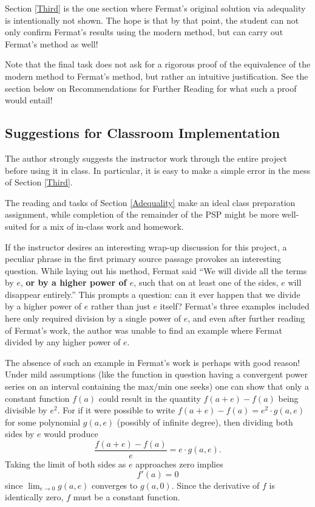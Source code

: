 Section \ref{Third} is the one section where Fermat's original
solution via adequality is intentionally not shown.  The hope is that
by that point, the student can not only confirm Fermat's results using
the modern method, but can carry out Fermat's method as well!

Note that the final task does not ask for a rigorous proof of the
equivalence of the modern method to Fermat's method, but rather an
intuitive justification.  See the section below on Recommendations for
Further Reading for what such a proof would entail!

\subsection*{Suggestions for Classroom Implementation}

The author strongly suggests the instructor work through the entire
project before using it in class. In particular, it is easy to make a
simple error in the mess of Section \ref{Third}.


The reading and tasks of Section \ref{Adequality} make an ideal class
preparation assignment, while completion of the remainder of the PSP
might be more well-suited for a mix of in-class work and homework.


If the instructor desires an interesting wrap-up discussion for this
project, a peculiar phrase in the first primary source passage
provokes an interesting question.  While laying out his method, Fermat
said ``{\sf We will divide all the terms by $e$, {\bf or by a higher
    power of $e$}, such that on at least one of the sides, $e$ will
  disappear entirely.}''  This prompts a question: can it ever happen
that we divide by a higher power of $e$ rather than just $e$ itself?
Fermat's three examples included here only required division by a
single power of $e$, and even after further reading of Fermat's work,
the author was unable to find an example where Fermat divided by any
higher power of $e$.

The absence of such an example in Fermat's work is perhaps with good
reason!  Under mild assumptions (like the function in question having
a convergent power series on an interval containing the max/min one
seeks) one can show that only a constant function $f(a)$ could result
in the quantity $f(a+e)-f(a)$ being divisible by $e^2$.  For if it
were possible to write $f(a+e)-f(a)= e^2\cdot g(a,e)$ for some
polynomial $g(a,e)$ (possibly of infinite degree), then dividing both
sides by $e$ would produce $$\frac{f(a+e)-f(a)}{e}=e\cdot g(a,e).$$
Taking the limit of both sides as $e$ approaches zero
implies $$f'(a)=0$$ since $\lim_{e\to 0}g(a,e)$ converges to $g(a,0)$.
Since the derivative of $f$ is identically zero, $f$ must be a
constant function.

